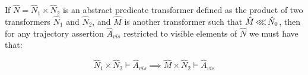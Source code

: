 \begin{corollary}
\label{thm:refinement-product}
If $\hat N = \hat N_{1} \times \hat N_{2}$ is an abstract predicate transformer defined as the product of two transformers $\hat N_{1}$ and $\hat N_{2}$, and $\hat M$ is another transformer such that $\hat M \operatorname{\lll} \hat N_{0}$, then for any trajectory assertion $\hat A_{vis}$ restricted to visible elements of $\hat N$ we must have that:

\begin{equation*}
\hat N_{1} \times \hat N_{2} \models \hat A_{vis} \implies \hat M \times \hat N_{2} \models \hat A_{vis}
\end{equation*}
\end{corollary}



